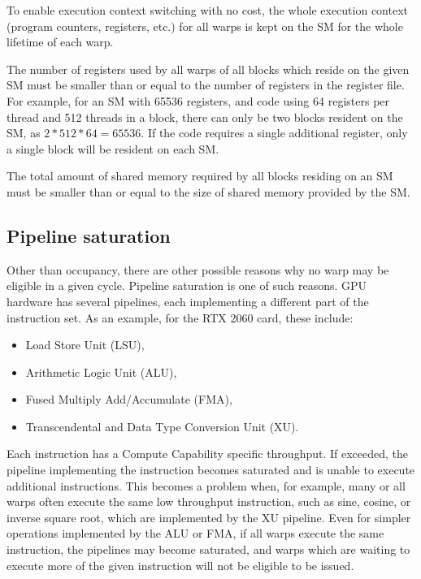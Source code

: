 To enable execution context switching with no cost, the whole execution context (program counters, registers, etc.) for all warps is kept on the SM for the whole lifetime of each warp. 


The number of registers used by all warps of all blocks which reside on the given SM must be smaller than or equal to the number of registers in the register file. For example, for an SM with 65536 registers, and code using 64 registers per thread and 512 threads in a block, there can only be two blocks resident on the SM, as $2*512*64 = 65536$. If the code requires a single additional register, only a single block will be resident on each SM.

The total amount of shared memory required by all blocks residing on an SM must be smaller than or equal to the size of shared memory provided by the SM. 

\subsection{Pipeline saturation}
\label{sec:cuda_pipelines}

Other than occupancy, there are other possible reasons why no warp may be eligible in a given cycle. Pipeline saturation is one of such reasons. GPU hardware has several pipelines, each implementing a different part of the instruction set. As an example, for the RTX 2060 card, these include\citep{site:nsight}:
\begin{itemize}
	\item Load Store Unit (LSU),
	\item Arithmetic Logic Unit (ALU),
	\item Fused Multiply Add/Accumulate (FMA),
	\item Transcendental and Data Type Conversion Unit (XU).
\end{itemize}

Each instruction has a Compute Capability specific throughput. If exceeded, the pipeline implementing the instruction becomes saturated and is unable to execute additional instructions. This becomes a problem when, for example, many or all warps often execute the same low throughput instruction, such as sine, cosine, or inverse square root, which are implemented by the XU pipeline. Even for simpler operations implemented by the ALU or FMA, if all warps execute the same instruction, the pipelines may become saturated, and warps which are waiting to execute more of the given instruction will not be eligible to be issued.

